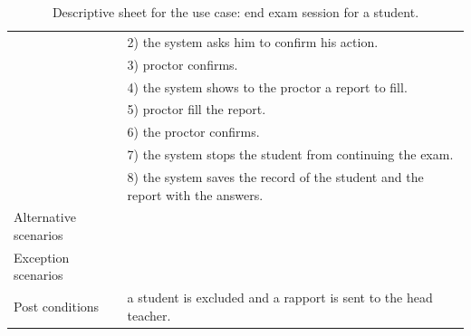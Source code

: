 \documentclass[]{uc2pfecaneva}
\begin{document}
\begin{table}[h]
\begin{tabularx}{\textwidth}{|l|X|}
            & 2) the system asks him to confirm his action.                                                                          \\
            & 3) proctor confirms.                                                                                                \\
            & 4) the system shows to the proctor a report to fill.                                                                   \\
            & 5) proctor fill the report.                                                                                            \\
            & 6) the proctor confirms.                                                                                                  \\
            & 7) the system stops the student from continuing the exam.                                                              \\
            & 8) the system saves the record of the student and the report with the answers.                                         \\ \hline
            Alternative scenarios
            \\ \hline
            Exception scenarios
            \\ \hline
            Post conditions
            & a student is excluded and a rapport is sent to the head teacher.                                                       \\ \hline
        \end{tabularx}
        \caption{Descriptive sheet for the use case: end exam session for a student.}
        \label{table:5}
    \end{table}
    \clearpage
\end{document}
